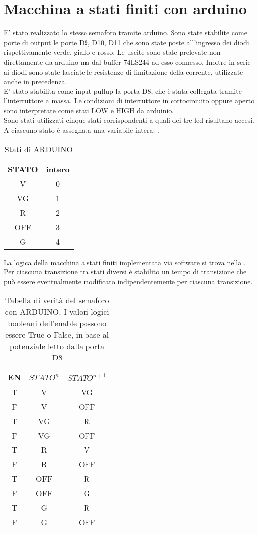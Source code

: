 \section{Macchina a stati finiti con arduino}
E' stato realizzato lo stesso semaforo tramite arduino.
Sono state stabilite come porte di output le porte D9, D10, D11 che sono state poste all'ingresso dei diodi rispettivamente verde, giallo e rosso. Le uscite sono state prelevate non direttamente da arduino ma dal buffer 74LS244 ad esso connesso. Inoltre in serie ai diodi sono state lasciate le resistenze di limitazione della corrente, utilizzate anche in precedenza.\\
E' stato stabilita come input-pullup la porta D8, che è stata collegata tramite l'interruttore a massa. Le condizioni di interruttore in cortocircuito oppure aperto sono interpretate come stati LOW e HIGH da arduinio.\\ 
Sono stati utilizzati cinque stati corrispondenti a quali dei tre led risultano accesi. A ciascuno stato è assegnata una variabile intera: .
\begin{table}[h]
	\centering
	\begin{tabular}{cc}		
		 STATO& intero\\
		 \midrule 
		 V & 0\\
		VG & 1\\
		R &  2\\
		OFF & 3\\
		G & 4\\ 
		          
 	\end{tabular}
	\caption{ Stati di ARDUINO }
	\label{t:stati_arduino}
\end{table}
La logica della macchina a stati finiti implementata via software si trova nella . Per ciascuna transizione tra stati diversi è stabilito un tempo di transizione che può essere eventualmente modificato indipendentemente per ciascuna transizione. 
\begin{table}[h]
	\centering
	\begin{tabular}{ccc}		
		 EN& $STATO^{n}$& $STATO^{n+1}$\\
		 \midrule 
		 T & V &  VG\\
		 F & V & OFF\\
		 T & VG & R\\
		 F & VG & OFF\\
		 T & R & V\\
		 F & R & OFF\\
		 T & OFF & R\\
		 F & OFF & G\\
		 T & G & R\\
		 F & G & OFF\\
		          
 	\end{tabular}
	\caption{ Tabella di verità del semaforo con ARDUINO. I valori logici booleani dell'enable possono essere True o False, in base al potenziale letto dalla porta D8 }
	\label{t:semaforo_arduino}
\end{table}

